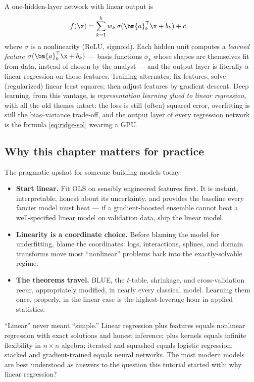 A one-hidden-layer network with linear output is
\[
  f(\x) = \sum_{k=1}^h w_k \, \sigma(\bm{a}_k^\top \x + b_k) + c,
\]
where $\sigma$ is a nonlinearity (ReLU, sigmoid). Each hidden unit computes a \emph{learned feature} $\sigma(\bm{a}_k^\top \x + b_k)$ — basis functions $\phi_k$ whose shapes are themselves fit from data, instead of chosen by the analyst — and the output layer is literally a linear regression on those features. Training alternates: fix features, solve (regularized) linear least squares; then adjust features by gradient descent. Deep learning, from this vantage, is \emph{representation learning glued to linear regression}, with all the old themes intact: the loss is still (often) squared error, overfitting is still the bias--variance trade-off, and the output layer of every regression network is the formula \eqref{eq:ridge-sol} wearing a GPU.

\subsection{Why this chapter matters for practice}

The pragmatic upshot for someone building models today:

\begin{itemize}
  \item \textbf{Start linear.} Fit OLS on sensibly engineered features first. It is instant, interpretable, honest about its uncertainty, and provides the baseline every fancier model must beat — if a gradient-boosted ensemble cannot beat a well-specified linear model on validation data, ship the linear model.
  \item \textbf{Linearity is a coordinate choice.} Before blaming the model for underfitting, blame the coordinates: logs, interactions, splines, and domain transforms move most ``nonlinear'' problems back into the exactly-solvable regime.
  \item \textbf{The theorems travel.} BLUE, the $t$-table, shrinkage, and cross-validation recur, appropriately modified, in nearly every classical model. Learning them once, properly, in the linear case is the highest-leverage hour in applied statistics.
\end{itemize}

\begin{keybox}
``Linear'' never meant ``simple.'' Linear regression plus features equals nonlinear regression with exact solutions and honest inference; plus kernels equals infinite flexibility in $n \times n$ algebra; iterated and squashed equals logistic regression; stacked and gradient-trained equals neural networks. The most modern models are best understood as answers to the question this tutorial started with: why linear regression?
\end{keybox}
